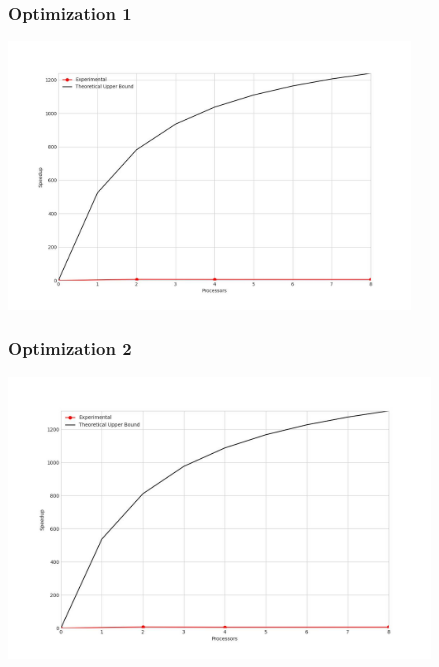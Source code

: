 \subsubsection{Optimization 1}
\begin{center}
    \resizebox{0.95\textwidth}{!}{}
    \includegraphics[width=0.8\textwidth]{../img/speedup-graph_type-random-250000-O1}
\end{center}

\clearpage
\subsubsection{Optimization 2}
\begin{center}
    \resizebox{0.95\textwidth}{!}{}
    \includegraphics[width=0.84\textwidth]{../img/speedup-graph_type-random-250000-O2}
\end{center}

